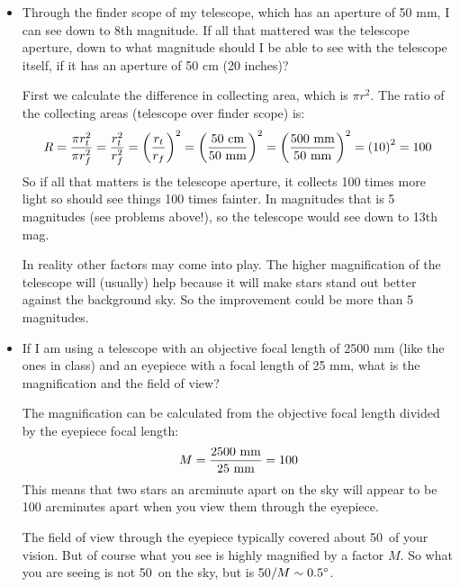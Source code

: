\documentclass[12pt, preprint]{aastex}
\begin{document}
\begin{itemize}
  \item Through the finder scope of my telescope, which has an
    aperture of 50 mm, I can see down to 8th magnitude. If all that
    mattered was the telescope aperture, down to what magnitude should
    I be able to see with the telescope itself, if it has an aperture
    of 50 cm (20 inches)?

    \begin{answer}
      First we calculate the difference in collecting area, which is
      $\pi r^2$. The ratio of the collecting areas (telescope over
      finder scope) is:
      \begin{equation}
        R = \frac{\pi r_{t}^2}{\pi r_f^2} =
        \frac{r_{t}^2}{r_f^2} = \left(\frac{r_t}{r_f}\right)^2 =
        \left(\frac{50 {\rm ~cm}}{50 {\rm ~mm}}\right)^2
        = \left(\frac{500 {\rm ~mm}}{50 {\rm ~mm}}\right)^2
        = \left(10\right)^2 = 100
      \end{equation}
      So if all that matters is the telescope aperture, it collects
      100 times more light so should see things 100 times fainter. In
      magnitudes that is 5 magnitudes (see problems above!), so the
      telescope would see down to 13th mag.

      In reality other factors may come into play. The higher
      magnification of the telescope will (usually) help because it
      will make stars stand out better against the background sky. So
      the improvement could be more than 5 magnitudes.
    \end{answer}

  \item If I am using a telescope with an objective focal length of
    2500 mm (like the ones in class) and an eyepiece with a focal
    length of 25 mm, what is the magnification and the field of view?

    \begin{answer}
      The magnification can be calculated from the objective focal
      length divided by the eyepiece focal length:
      \begin{equation}
        M = \frac{2500 {\rm ~mm}}{25 {\rm ~mm}} = 100
      \end{equation}
      This means that two stars an arcminute apart on the sky will
      appear to be 100 arcminutes apart when you view them through the
      eyepiece. 

      The field of view through the eyepiece typically covered about
      50\degree\ of your vision. But of course what you see is highly
      magnified by a factor $M$. So what you are seeing is not
      50\degree\ on the sky, but is 50\degree$/M \sim 0.5{}^\circ$.
    \end{answer}
\end{itemize}
\end{document}
